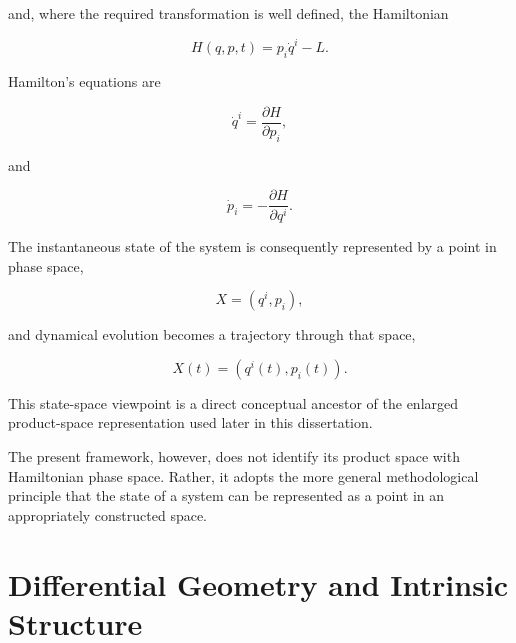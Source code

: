 \documentclass[12pt,oneside]{book}
\begin{document}
and, where the required transformation is well defined, the
Hamiltonian

\begin{equation}
    H(q,p,t)
    =
    p_i\dot{q}^i
    -
    L.
    \label{eq:hamiltonian-definition}
\end{equation}

Hamilton's equations are

\begin{equation}
    \dot{q}^i
    =
    \frac{\partial H}
    {\partial p_i},
    \label{eq:hamilton-first}
\end{equation}

and

\begin{equation}
    \dot{p}_i
    =
    -
    \frac{\partial H}
    {\partial q^i}.
    \label{eq:hamilton-second}
\end{equation}

The instantaneous state of the system is consequently
represented by a point in phase space,

\begin{equation}
    X
    =
    (q^i,p_i),
    \label{eq:phase-space-point}
\end{equation}

and dynamical evolution becomes a trajectory through that
space,

\begin{equation}
    X(t)
    =
    \left(
        q^i(t),
        p_i(t)
    \right).
    \label{eq:phase-space-trajectory}
\end{equation}

This state-space viewpoint is a direct conceptual ancestor of
the enlarged product-space representation used later in this
dissertation.

The present framework, however, does not identify its product
space with Hamiltonian phase space. Rather, it adopts the more
general methodological principle that the state of a system can
be represented as a point in an appropriately constructed
space.


\section{Differential Geometry and Intrinsic Structure}
\label{sec:differential-geometry-history}
\end{document}
